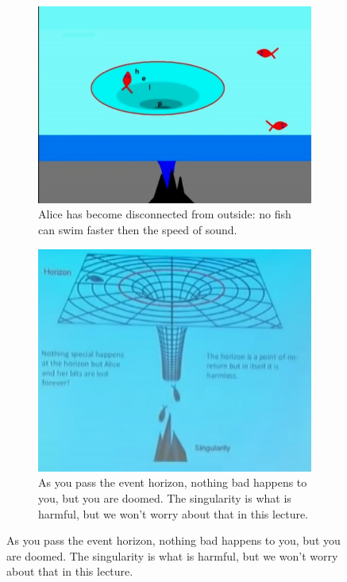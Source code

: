 \documentclass[]{article}
\begin{document}
\begin{figure}[H]
	\caption{William Unruh's analogy for a black hole}
	\begin{subfigure}[t]{0.45\textwidth}
		\caption{Alice has become disconnected from outside: no fish can swim faster then the speed of sound.}
		\includegraphics[width=\textwidth]{wh-alice}
	\end{subfigure}
	\begin{subfigure}[t]{0.45\textwidth}
		\caption{As you pass the event horizon, nothing bad happens to you, but you are doomed. The singularity is what is harmful, but we won't worry about that in this lecture.}
		\includegraphics[width=\textwidth]{wh-black-hole}
	\end{subfigure}
\end{figure} 
\end{document}
